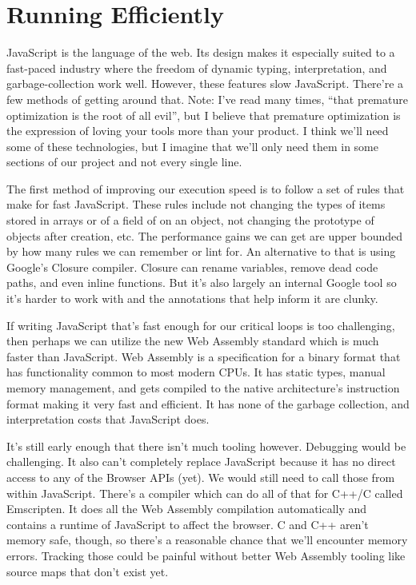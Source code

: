 \documentclass[draftclsnofoot,onecolumn]{IEEEtran}
\begin{document}
\section{Running Efficiently}
JavaScript is the language of the web.  Its design makes it especially suited to a fast-paced industry where the freedom of dynamic typing, interpretation, and garbage-collection work well.  However, these features slow JavaScript.  There’re a few methods of getting around that.  Note: I’ve read many times, “that premature optimization is the root of all evil”, but I believe that premature optimization is the expression of loving your tools more than your product.  I think we’ll need some of these technologies, but I imagine that we’ll only need them in some sections of our project and not every single line.

The first method of improving our execution speed is to follow a set of rules that make for fast JavaScript\cite{WEBSITE:1}.  These rules include not changing the types of items stored in arrays or of a field of on an object, not changing the prototype of objects after creation, etc.  The performance gains we can get are upper bounded by how many rules we can remember or lint for.  An alternative to that is using Google’s Closure compiler.  Closure can rename variables, remove dead code paths, and even inline functions\cite{WEBSITE:2}.  But it’s also largely an internal Google tool so it’s harder to work with and the annotations that help inform it are clunky\cite{WEBSITE:3}.

If writing JavaScript that’s fast enough for our critical loops is too challenging, then perhaps we can utilize the new Web Assembly standard which is much faster than JavaScript.  Web Assembly is a specification for a binary format that has functionality common to most modern CPUs.  It has static types, manual memory management, and gets compiled to the native architecture’s instruction format making it very fast and efficient.  It has none of the garbage collection, and interpretation costs that JavaScript does\cite{WEBSITE:4}.

It’s still early enough that there isn’t much tooling however.  Debugging would be challenging.  It also can’t completely replace JavaScript because it has no direct access to any of the Browser APIs (yet).  We would still need to call those from within JavaScript.  There’s a compiler which can do all of that for C++/C called Emscripten.  It does all the Web Assembly compilation automatically and contains a runtime of JavaScript to affect the browser\cite{WEBSITE:5}.  C and C++ aren’t memory safe, though, so there’s a reasonable chance that we’ll encounter memory errors.  Tracking those could be painful without better Web Assembly tooling like source maps that don’t exist yet\cite{WEBSITE:6}.
\end{document}
